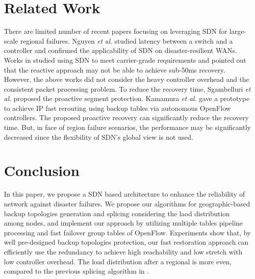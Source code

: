 \documentclass[10pt,journal]{IEEEtran}
\begin{document}
\section{Related Work}
There are limited number of recent papers focusing on leveraging SDN for large-scale regional failures. Nguyen \textit{et al.} \cite{nguyen2013software} studied latency between a switch and a controller and confirmed the applicability of SDN on disaster-resilient WANs. Works in \cite{sharma2012openflow,staessens2011software} studied using SDN to meet carrier-grade requirements and pointed out that the reactive approach may not be able to achieve sub-50ms recovery. However, the above works did not consider the heavy controller overhead and the consistent packet processing problem\cite{katta2013incremental,peresini2013cpp}. To reduce the recovery time, Sgambelluri \textit{et al.} \cite{sgambelluri2013openflow} proposed the proactive segment protection. Kamamura \textit{et al.} \cite{kamamura2013autonomous} gave a prototype to achieve IP fast rerouting using backup tables via autonomous OpenFlow controllers. The proposed proactive recovery can significantly reduce the recovery time. But, in face of region failure scenarios, the performance may be significantly decreased since the flexibility of SDN's global view is not used.
\section{Conclusion}\label{sec:conclusion}
In this paper, we propose a SDN based architecture to enhance the reliability of network against disaster failures. We propose our algorithms for geographic-based backup topologies generation and splicing considering the laod distribution among nodes, and implement our approach by utilizing multiple tables pipeline processing and fast failover group tables of OpenFlow. Experiments show that, by well pre-designed backup topologies protection, our fast restoration approach can efficiently use the redundancy to achieve high reachability and low stretch with low controller overhead. The load distribution after a regional is more even, compared to the previous splicing algorithm in \cite{xie2014designing}.




\end{document}

